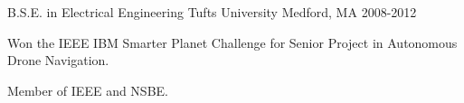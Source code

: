 

\begin{cventries}

  \cventry
    {B.S.E. in Electrical Engineering} %
    {Tufts University} %
    {Medford, MA} %
    {2008-2012} %
    {
      \begin{cvitems} %
        \item {Won the IEEE IBM Smarter Planet Challenge for Senior Project in Autonomous Drone Navigation.}
        \item {Member of IEEE and NSBE.}
      \end{cvitems}
    }

\end{cventries}
